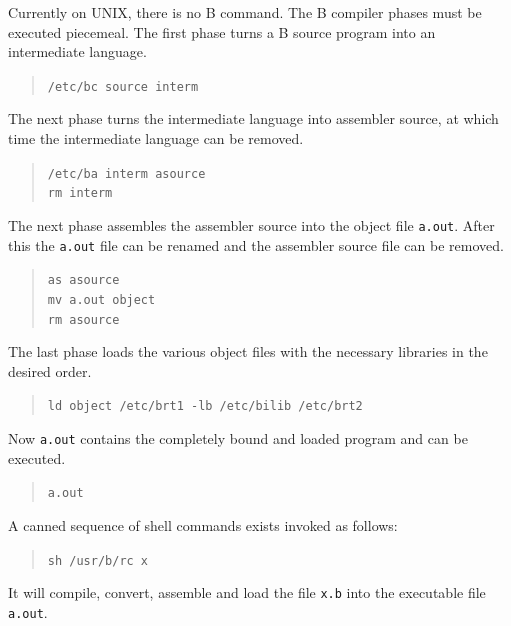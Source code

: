 \documentclass[12pt]{report}
\begin{document}
Currently on UNIX, there is no B command. The B compiler phases must
be executed piecemeal. The first phase turns a B source program into
an intermediate language.
\begin{quote}
  \verb|/etc/bc source interm|
\end{quote}
The next phase turns the intermediate language into assembler source,
at which time the intermediate language can be removed.
\begin{quote}
  \verb|/etc/ba interm asource| \\
  \verb|rm interm|
\end{quote}
The next phase assembles the assembler source into the object file
\verb|a.out|. After this the \verb|a.out| file can be renamed and the
assembler source file can be removed.
\begin{quote}
  \verb|as asource| \\
  \verb|mv a.out object| \\
  \verb|rm asource|
\end{quote}
The last phase loads the various object files with the necessary
libraries in the desired order.
\begin{quote}
  \verb|ld object /etc/brt1 -lb /etc/bilib /etc/brt2|
\end{quote}
Now \verb|a.out| contains the completely bound and loaded program and
can be executed.
\begin{quote}
  \verb|a.out|
\end{quote}
A canned sequence of shell commands exists invoked as follows:
\begin{quote}
  \verb|sh /usr/b/rc x|
\end{quote}
It will compile, convert, assemble and load the file \verb|x.b| into the
executable file \verb|a.out|.

\end{document}
